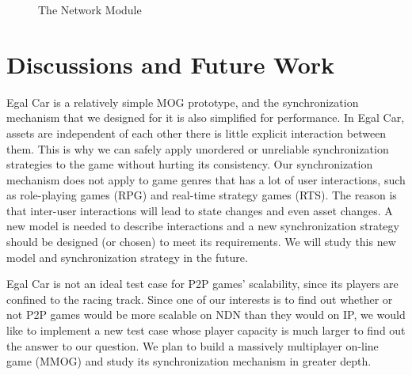 \documentclass{article}
\begin{document}
\begin{figure}
\begin{center}
\caption{The Network Module}
\label{img:networkmodule}
\end{center}
\end{figure}


\section{Discussions and Future Work}
\label{futurework}

Egal Car is a relatively simple MOG prototype, and the synchronization mechanism that we designed for it is also simplified for performance. In Egal Car, assets are independent of each other there is little explicit interaction between them. This is why we can safely apply unordered or unreliable synchronization strategies to the game without hurting its consistency. Our synchronization mechanism does not apply to game genres that has a lot of user interactions, such as role-playing games (RPG) and real-time strategy games (RTS). The reason is that inter-user interactions will lead to state changes and even asset changes. A new model is needed to describe interactions and a new synchronization strategy should be designed (or chosen) to meet its requirements. We will study this new model and synchronization strategy in the future.

Egal Car is not an ideal test case for P2P games' scalability, since its players are confined to the racing track. Since one of our interests is to find out whether or not P2P games would be more scalable on NDN than they would on IP, we would like to implement a new test case whose player capacity is much larger to find out the answer to our question. We plan to build a massively multiplayer on-line game (MMOG) and study its synchronization mechanism in greater depth.
\end{document}
